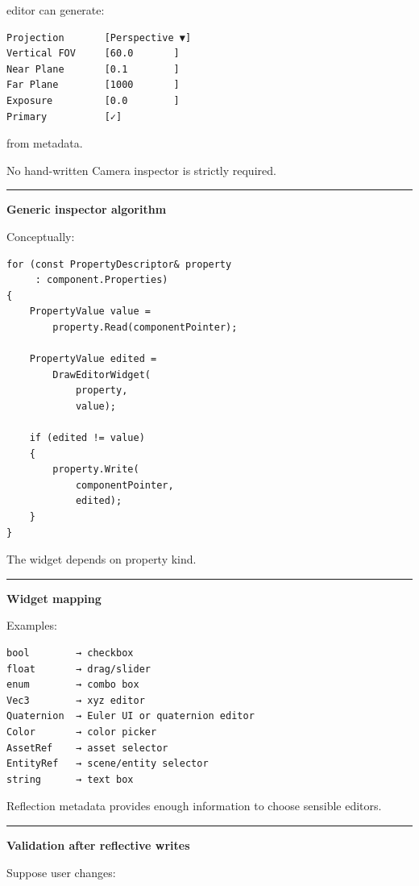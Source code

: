 editor can generate:

\begin{verbatim}
Projection       [Perspective ▼]
Vertical FOV     [60.0       ]
Near Plane       [0.1        ]
Far Plane        [1000       ]
Exposure         [0.0        ]
Primary          [✓]
\end{verbatim}

from metadata.

No hand-written Camera inspector is strictly required.

\begin{center}\rule{0.5\linewidth}{0.5pt}\end{center}

\textbf{Generic inspector algorithm}

Conceptually:

\begin{verbatim}
for (const PropertyDescriptor& property
     : component.Properties)
{
    PropertyValue value =
        property.Read(componentPointer);

    PropertyValue edited =
        DrawEditorWidget(
            property,
            value);

    if (edited != value)
    {
        property.Write(
            componentPointer,
            edited);
    }
}
\end{verbatim}

The widget depends on property kind.

\begin{center}\rule{0.5\linewidth}{0.5pt}\end{center}

\textbf{Widget mapping}

Examples:

\begin{verbatim}
bool        → checkbox
float       → drag/slider
enum        → combo box
Vec3        → xyz editor
Quaternion  → Euler UI or quaternion editor
Color       → color picker
AssetRef    → asset selector
EntityRef   → scene/entity selector
string      → text box
\end{verbatim}

Reflection metadata provides enough information to choose sensible editors.

\begin{center}\rule{0.5\linewidth}{0.5pt}\end{center}

\textbf{Validation after reflective writes}

Suppose user changes:

